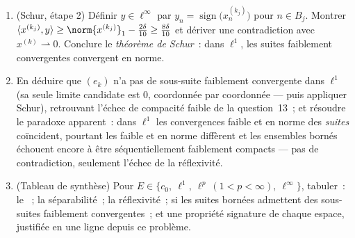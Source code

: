 \begin{problem}[{Problème de fin de semaine --- $(\ell^p)' =
\ell^q$, réflexivité, et l'étrangeté de $\ell^\infty$}]
\begin{enumerate}[resume]
        pour chaque $n$ (quelles fonctionnelles~?), puis
        construire récursivement des indices $k_1 < k_2 <
        \cdots$ et des entiers $0 = N_0 < N_1 < N_2 <
        \cdots$ tels que la masse de $x^{(k_j)}$ se
        concentre sur le bloc $B_j =
        \intoc{N_{j-1}}{N_j}$~:
        \[
        \sum_{n \in B_j}\bigl|x^{(k_j)}_n\bigr| \geq
        \norm{x^{(k_j)}}_1 - \frac\delta{10} .
        \]
  \item (Schur, étape 2) Définir $y \in \ell^\infty$ par $y_n
        = \operatorname{sign}\bigl(x^{(k_j)}_n\bigr)$ pour $n
        \in B_j$. Montrer $\langle x^{(k_j)}, y\rangle \geq
        \norm{x^{(k_j)}}_1 - \frac{2\delta}{10} \geq
        \frac{8\delta}{10}$ et dériver une contradiction avec
        $x^{(k)} \rightharpoonup 0$. Conclure le
        \emph{théorème de Schur}~: dans $\ell^1$, les suites
        faiblement convergentes convergent en norme.
  \item En déduire que $(e_k)$ n'a pas de sous-suite
        faiblement convergente dans $\ell^1$ (sa seule limite
        candidate est $0$, coordonnée par coordonnée --- puis
        appliquer Schur), retrouvant l'échec de compacité
        faible de la question~13~; et résoudre le paradoxe
        apparent~: dans $\ell^1$ les convergences faible et en
        norme des \emph{suites} coïncident, pourtant les
        \emph{} faible et en norme diffèrent et les
        ensembles bornés échouent encore à être
        séquentiellement faiblement compacts --- pas de
        contradiction, seulement l'échec de la réflexivité.
  \item (Tableau de synthèse) Pour $E \in \{c_0,\ \ell^1,\
        \ell^p\ (1{<}p{<}\infty),\ \ell^\infty\}$, tabuler~:
        le ~; la séparabilité~; la réflexivité~; si les
        suites bornées admettent des sous-suites faiblement
        convergentes~; et une propriété signature de chaque
        espace, justifiée en une ligne depuis ce problème.
\end{enumerate}


\end{problem}
